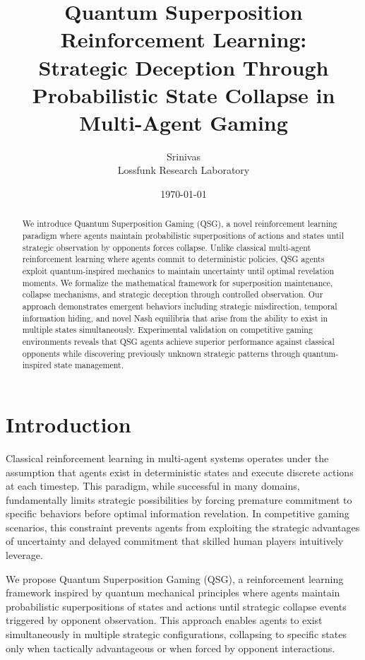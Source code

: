 \documentclass[11pt,a4paper]{article}
\title{\textbf{Quantum Superposition Reinforcement Learning:\\Strategic Deception Through Probabilistic State Collapse in Multi-Agent Gaming}}
\author{Srinivas\\Lossfunk Research Laboratory}
\date{\today}
\begin{document}
\maketitle

\begin{abstract}
We introduce Quantum Superposition Gaming (QSG), a novel reinforcement learning paradigm where agents maintain probabilistic superpositions of actions and states until strategic observation by opponents forces collapse. Unlike classical multi-agent reinforcement learning where agents commit to deterministic policies, QSG agents exploit quantum-inspired mechanics to maintain uncertainty until optimal revelation moments. We formalize the mathematical framework for superposition maintenance, collapse mechanisms, and strategic deception through controlled observation. Our approach demonstrates emergent behaviors including strategic misdirection, temporal information hiding, and novel Nash equilibria that arise from the ability to exist in multiple states simultaneously. Experimental validation on competitive gaming environments reveals that QSG agents achieve superior performance against classical opponents while discovering previously unknown strategic patterns through quantum-inspired state management.
\end{abstract}

\section{Introduction}

Classical reinforcement learning in multi-agent systems operates under the assumption that agents exist in deterministic states and execute discrete actions at each timestep. This paradigm, while successful in many domains, fundamentally limits strategic possibilities by forcing premature commitment to specific behaviors before optimal information revelation. In competitive gaming scenarios, this constraint prevents agents from exploiting the strategic advantages of uncertainty and delayed commitment that skilled human players intuitively leverage.

We propose Quantum Superposition Gaming (QSG), a reinforcement learning framework inspired by quantum mechanical principles where agents maintain probabilistic superpositions of states and actions until strategic collapse events triggered by opponent observation. This approach enables agents to exist simultaneously in multiple strategic configurations, collapsing to specific states only when tactically advantageous or when forced by opponent interactions.
\end{document}
